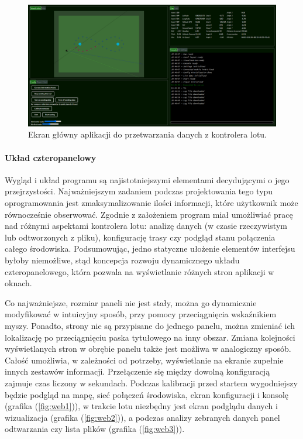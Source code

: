 \documentclass[12pt, a4paper]{article}
\let\oldref\ref
\renewcommand{\ref}[1]{(\oldref{#1})}
\begin{document}
 \begin{figure}[ht]
    \centering
    \includegraphics[width=1\textwidth]{weball}
    \caption{Ekran główny aplikacji do przetwarzania danych z kontrolera lotu.}
    \label{fig:weball}
\end{figure}

\paragraph{Układ czteropanelowy}\mbox{}

Wygląd i układ programu są najistotniejszymi elementami decydującymi o jego przejrzystości. Najważniejszym zadaniem podczas projektowania tego typu oprogramowania jest zmaksymalizowanie ilości informacji, które użytkownik może równocześnie obserwować. Zgodnie z założeniem program  miał umożliwiać pracę nad różnymi aspektami kontrolera lotu: analizę danych (w czasie rzeczywistym lub odtworzonych z pliku), konfigurację trasy czy podgląd stanu połączenia całego środowiska. Podsumowując, jedno statyczne ułożenie elementów interfejsu byłoby niemożliwe, stąd koncepcja rozwoju dynamicznego układu czteropanelowego, która pozwala na wyświetlanie różnych stron aplikacji w oknach.

Co najważniejsze, rozmiar paneli nie jest stały, można go dynamicznie modyfikować w intuicyjny sposób, przy pomocy przeciągnięcia wskaźnikiem myszy. Ponadto, strony nie są przypisane do jednego panelu, można zmieniać ich lokalizację po przeciągnięciu paska tytułowego na inny obszar. Zmiana kolejności wyświetlanych stron w obrębie panelu także jest możliwa w analogiczny sposób. Całość umożliwia, w zależności od potrzeby, wyświetlanie na ekranie zupełnie innych zestawów informacji. Przełączenie się między dowolną konfiguracją zajmuje czas liczony w sekundach. Podczas kalibracji przed startem wygodniejszy będzie podgląd na mapę, sieć połączeń środowiska, ekran konfiguracji i konsolę (grafika \ref{fig:web1}), w trakcie lotu niezbędny jest ekran podglądu danych i wizualizacja (grafika \ref{fig:web2}), a podczas analizy zebranych danych panel odtwarzania czy lista plików (grafika \ref{fig:web3}).
\end{document}
